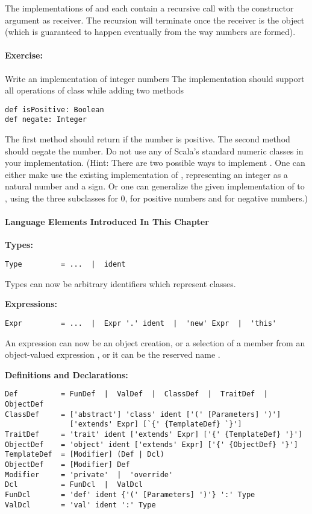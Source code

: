 \documentclass[a4paper,12pt,twoside,titlepage]{book}
\newcommand{\exercise}{\paragraph{Exercise:}}
\begin{document}
The implementations of \code{+} and \code{-} each contain a recursive
call with the constructor argument as receiver. The recursion will
terminate once the receiver is the  object (which is
guaranteed to happen eventually from the way numbers are formed).

\exercise Write an implementation  of integer numbers
The implementation should support all operations of class 
while adding two methods
\begin{lstlisting}
def isPositive: Boolean
def negate: Integer
\end{lstlisting}
The first method should return  if the number is positive. The second method should negate the number.
Do not use any of Scala's standard numeric classes in your
implementation. (Hint: There are two possible ways to implement
. One can either make use the existing implementation of
, representing an integer as a natural number and a sign.
Or one can generalize the given implementation of  to
, using the three subclasses  for 0, 
 for positive numbers and  for negative numbers.)



\paragraph{Language Elements Introduced In This Chapter}

\textbf{Types:}
\begin{lstlisting}
Type         = ...  |  ident
\end{lstlisting}

Types can now be arbitrary identifiers which represent classes.

\textbf{Expressions:}
\begin{lstlisting}
Expr         = ...  |  Expr '.' ident  |  'new' Expr  |  'this'
\end{lstlisting}

An expression can now be an object creation, or
a selection  of a member 
from an object-valued expression , or it can be the reserved name .

\textbf{Definitions and Declarations:}
\begin{lstlisting}
Def          = FunDef  |  ValDef  |  ClassDef  |  TraitDef  |  ObjectDef
ClassDef     = ['abstract'] 'class' ident ['(' [Parameters] ')'] 
               ['extends' Expr] [`{' {TemplateDef} `}']
TraitDef     = 'trait' ident ['extends' Expr] ['{' {TemplateDef} '}']
ObjectDef    = 'object' ident ['extends' Expr] ['{' {ObjectDef} '}']
TemplateDef  = [Modifier] (Def | Dcl)
ObjectDef    = [Modifier] Def
Modifier     = 'private'  |  'override'
Dcl          = FunDcl  |  ValDcl
FunDcl       = 'def' ident {'(' [Parameters] ')'} ':' Type
ValDcl       = 'val' ident ':' Type
\end{lstlisting}
\end{document}
